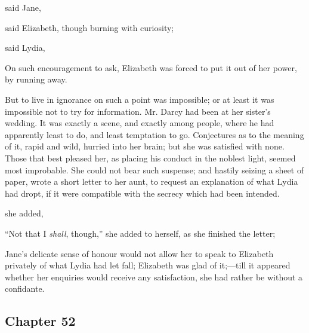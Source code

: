  said Jane, 

 said Elizabeth, though burning with curiosity; 

 said Lydia, 

On such encouragement to ask, Elizabeth was forced to put it out of her power, by running away.

But to live in ignorance on such a point was impossible; or at least it was impossible not to try for information. Mr. Darcy had been at her sister's wedding. It was exactly a scene, and exactly among people, where he had apparently least to do, and least temptation to go. Conjectures as to the meaning of it, rapid and wild, hurried into her brain; but she was satisfied with none. Those that best pleased her, as placing his conduct in the noblest light, seemed most improbable. She could not bear such suspense; and hastily seizing a sheet of paper, wrote a short letter to her aunt, to request an explanation of what Lydia had dropt, if it were compatible with the secrecy which had been intended.

 she added, 

“Not that I {\em shall}, though,” she added to herself, as she finished the letter; 

Jane's delicate sense of honour would not allow her to speak to Elizabeth privately of what Lydia had let fall; Elizabeth was glad of it;---till it appeared whether her enquiries would receive any satisfaction, she had rather be without a confidante.

\subsection[chapter-52]{\useURL[url52][][][]\from[url52] Chapter 52}

